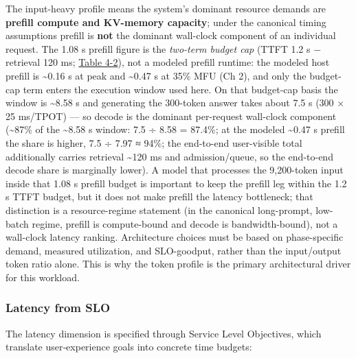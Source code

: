 The input-heavy profile means the system's dominant resource demands are
\textbf{prefill compute and KV-memory capacity}; under the canonical
timing assumptions prefill is \textbf{not} the dominant wall-clock
component of an individual request. The 1.08 s prefill figure is the
\emph{two-term budget cap} (TTFT 1.2 s − retrieval 120 ms; \hyperref[tab:4.2]{Table 4-2}),
not a modeled prefill runtime: the modeled host prefill is
\textasciitilde0.16 s at peak and \textasciitilde0.47 s at 35\% MFU (Ch
2), and only the budget-cap term enters the execution window used here.
On that budget-cap basis the window is \textasciitilde8.58 s and
generating the 300-token answer takes about 7.5 s (300 × 25 ms/TPOT) ---
so decode is the dominant per-request wall-clock component
(\textasciitilde87\% of the \textasciitilde8.58 s window: 7.5 ÷ 8.58 =
87.4\%; at the modeled \textasciitilde0.47 s prefill the share is
higher, 7.5 ÷ 7.97 ≈ 94\%; the end-to-end user-visible total
additionally carries retrieval \textasciitilde120 ms and
admission/queue, so the end-to-end decode share is marginally lower). A
model that processes the 9,200-token input inside that 1.08 s prefill
budget is important to keep the prefill leg within the 1.2 s TTFT
budget, but it does not make prefill the latency bottleneck; that
distinction is a resource-regime statement (in the canonical
long-prompt, low-batch regime, prefill is compute-bound and decode is
bandwidth-bound), not a wall-clock latency ranking. Architecture choices
must be based on phase-specific demand, measured utilization, and
SLO-goodput, rather than the input/output token ratio alone. This is why
the token profile is the primary architectural driver for this workload.

\subsubsection{Latency from SLO}\label{latency-from-slo}

The latency dimension is specified through Service Level Objectives,
which translate user‑experience goals into concrete time budgets:

